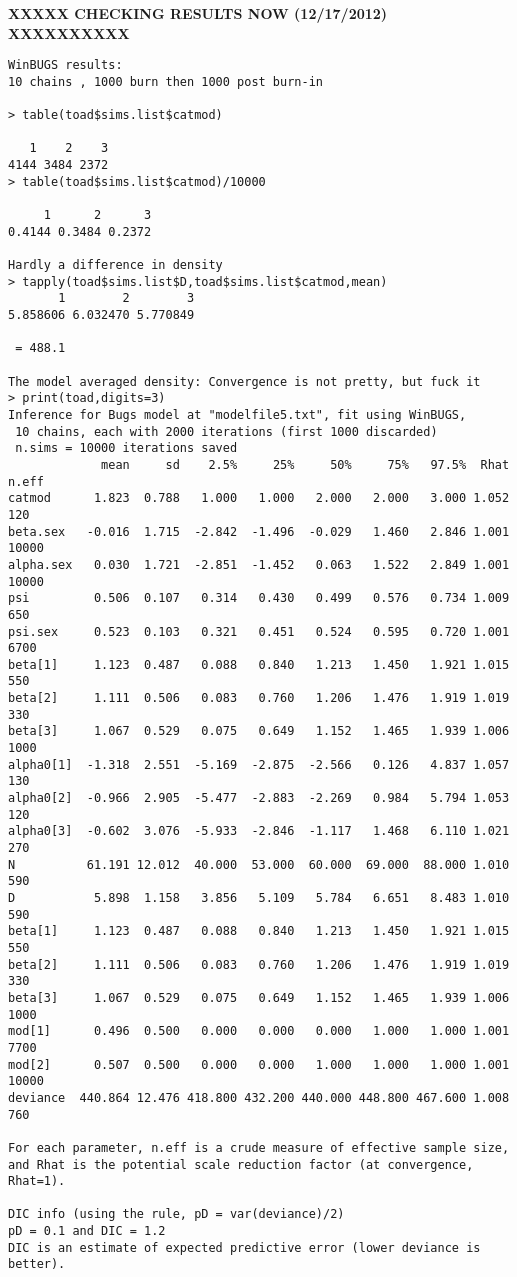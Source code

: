 {\bf XXXXX CHECKING RESULTS NOW (12/17/2012) XXXXXXXXXX}
{\small
\begin{verbatim}
WinBUGS results:
10 chains , 1000 burn then 1000 post burn-in

> table(toad$sims.list$catmod)

   1    2    3
4144 3484 2372
> table(toad$sims.list$catmod)/10000

     1      2      3
0.4144 0.3484 0.2372

Hardly a difference in density
> tapply(toad$sims.list$D,toad$sims.list$catmod,mean)
       1        2        3
5.858606 6.032470 5.770849

 = 488.1

The model averaged density: Convergence is not pretty, but fuck it
> print(toad,digits=3)
Inference for Bugs model at "modelfile5.txt", fit using WinBUGS,
 10 chains, each with 2000 iterations (first 1000 discarded)
 n.sims = 10000 iterations saved
             mean     sd    2.5%     25%     50%     75%   97.5%  Rhat n.eff
catmod      1.823  0.788   1.000   1.000   2.000   2.000   3.000 1.052   120
beta.sex   -0.016  1.715  -2.842  -1.496  -0.029   1.460   2.846 1.001 10000
alpha.sex   0.030  1.721  -2.851  -1.452   0.063   1.522   2.849 1.001 10000
psi         0.506  0.107   0.314   0.430   0.499   0.576   0.734 1.009   650
psi.sex     0.523  0.103   0.321   0.451   0.524   0.595   0.720 1.001  6700
beta[1]     1.123  0.487   0.088   0.840   1.213   1.450   1.921 1.015   550
beta[2]     1.111  0.506   0.083   0.760   1.206   1.476   1.919 1.019   330
beta[3]     1.067  0.529   0.075   0.649   1.152   1.465   1.939 1.006  1000
alpha0[1]  -1.318  2.551  -5.169  -2.875  -2.566   0.126   4.837 1.057   130
alpha0[2]  -0.966  2.905  -5.477  -2.883  -2.269   0.984   5.794 1.053   120
alpha0[3]  -0.602  3.076  -5.933  -2.846  -1.117   1.468   6.110 1.021   270
N          61.191 12.012  40.000  53.000  60.000  69.000  88.000 1.010   590
D           5.898  1.158   3.856   5.109   5.784   6.651   8.483 1.010   590
beta[1]     1.123  0.487   0.088   0.840   1.213   1.450   1.921 1.015   550
beta[2]     1.111  0.506   0.083   0.760   1.206   1.476   1.919 1.019   330
beta[3]     1.067  0.529   0.075   0.649   1.152   1.465   1.939 1.006  1000
mod[1]      0.496  0.500   0.000   0.000   0.000   1.000   1.000 1.001  7700
mod[2]      0.507  0.500   0.000   0.000   1.000   1.000   1.000 1.001 10000
deviance  440.864 12.476 418.800 432.200 440.000 448.800 467.600 1.008   760

For each parameter, n.eff is a crude measure of effective sample size,
and Rhat is the potential scale reduction factor (at convergence, Rhat=1).

DIC info (using the rule, pD = var(deviance)/2)
pD = 0.1 and DIC = 1.2
DIC is an estimate of expected predictive error (lower deviance is better).
\end{verbatim}
}






